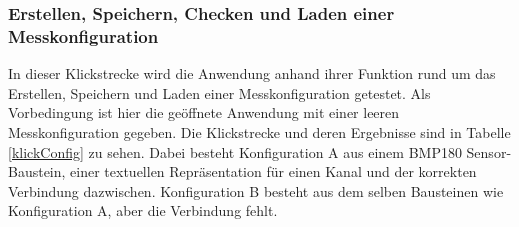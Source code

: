 \documentclass[parskip=full]{scrartcl}
\begin{document}
\subsubsection{Erstellen, Speichern, Checken und Laden einer Messkonfiguration}

In dieser Klickstrecke wird die Anwendung anhand ihrer Funktion rund um das Erstellen, Speichern und Laden einer Messkonfiguration getestet. Als Vorbedingung ist hier die geöffnete Anwendung mit einer leeren Messkonfiguration gegeben. Die Klickstrecke und deren Ergebnisse sind in Tabelle \ref{klickConfig} zu sehen. Dabei besteht Konfiguration A aus einem BMP180 Sensor-Baustein, einer textuellen Repräsentation für einen Kanal und der korrekten Verbindung dazwischen. Konfiguration B besteht aus dem selben Bausteinen wie Konfiguration A, aber die Verbindung fehlt.  
\end{document}
